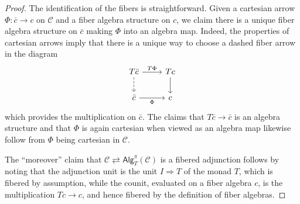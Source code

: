 \documentclass[a4paper,10pt
]{article}%
\numberwithin{equation}{section}
\numberwithin{figure}{section}
\theoremstyle{definition} %
\newcommand{\1}{\ensuremath{\mathbbm 1}}%
\begin{document}
\begin{proof}
        The identification of the fibers is straightforward.
	Given a cartesian arrow $\Phi \colon \bar{c} \to c$ on $\mathcal{C}$ and a fiber algebra structure on $c$, we claim there is a unique fiber algebra structure on $\bar{c}$ making $\Phi$ into an algebra map. Indeed, the properties of cartesian arrows imply that there is a unique way to choose a dashed fiber arrow in the diagram
	\[
	\begin{tikzcd}
	T \bar{c} \ar{r}{T \Phi} \ar[dashed]{d} & T c \ar{d}
	\\
	\bar{c} \ar{r}[swap]{\Phi} & c
	\end{tikzcd}
	\]
	which provides the multiplication on $\bar{c}$.
	The claims that $T\bar{c} \to \bar{c}$ is an algebra structure and that 
	$\Phi$ is again cartesian when viewed as an algebra map likewise follow from 
	$\Phi$ being cartesian in $\mathcal{C}$.
	
	The ``moreover'' claim that 
	$\mathcal{C} \rightleftarrows \mathsf{Alg}^{\pi}_T(\mathcal{C})$
	is a fibered adjunction
	follows by noting that the adjunction unit is the unit
	$I \Rightarrow T$ of the monad $T$, 
	which is fibered by assumption,
	while the counit, evaluated on a fiber algebra $c$, is the multiplication $Tc \to c$, and hence fibered by the definition of fiber algebras.
\end{proof}
\end{document}
